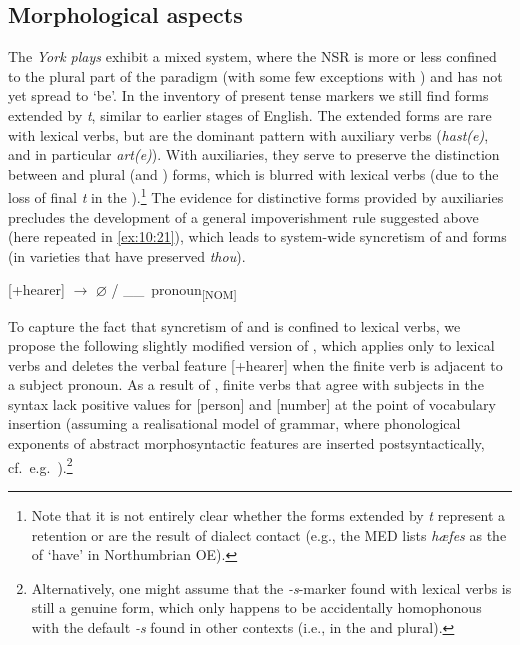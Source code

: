 \documentclass[output=paper]{langsci/langscibook}
\begin{document}
\subsection{Morphological aspects}
The \emph{York plays} exhibit a mixed system, where the \gls{NSR} is more or less confined to the plural part of the paradigm (with
some few exceptions with \Fsg{}) and has not yet spread to `be'. In the
inventory of present tense markers we still find \Ssg{} forms extended by
\emph{t}, similar to earlier stages of English. The extended forms are rare
with lexical verbs, but are the dominant pattern with auxiliary
verbs (\emph{hast(e)}, and in particular \emph{art(e)}). With auxiliaries, they
serve to preserve the distinction between \Ssg{} and plural (and \Tsg{}) forms,
which is blurred with lexical verbs (due to the loss of final \emph{t} in the
\Ssg{}).\footnote{Note that it is not entirely clear whether the \Ssg{} forms
extended by \emph{t} represent a retention or are the result of dialect contact
(e.g., the MED lists \emph{hæfes} as the \Ssg{} of `have' in Northumbrian
\gls{OE}).} The evidence for distinctive \Ssg{} forms provided by auxiliaries
precludes the development of a general impoverishment rule
suggested above (here repeated in \ref{ex:10:21}), which leads to system-wide syncretism
of \Ssg{} and \Tsg{} forms (in varieties that have preserved \emph{thou}).

\ea\label{ex:10:21}
\mbox{[+hearer]} {$\rightarrow$ $\varnothing$} / \_\_\ pronoun\textsubscript{[NOM]}
\z

To capture the fact that syncretism of \Ssg{} and \Tsg{} is confined to lexical
verbs, we propose the following slightly modified version of , which
applies only to lexical verbs and deletes the verbal  feature
[+hearer] when the finite verb is adjacent to a \Ssg{} subject pronoun. As a
result of , finite verbs that agree with \Ssg{} subjects in the syntax lack
positive values for [person] and [number] at the point of vocabulary insertion
(assuming a realisational model of grammar, where phonological exponents of
abstract morphosyntactic features are inserted postsyntactically, cf.\ e.g.\
\citealt{HalleMarantz1993}).\footnote{Alternatively, one might assume that the
\emph{-s}-marker found with \Ssg{} lexical verbs is still a genuine \Ssg{}
form, which only happens to be accidentally homophonous with the default
\emph{-s} found in other contexts (i.e., in the \Tsg{} and plural).}
\end{document}
